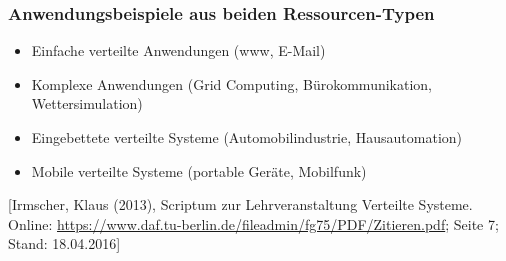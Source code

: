\documentclass[a4paper]{scrartcl}
\begin{document}
	\subsubsection{Anwendungsbeispiele aus beiden Ressourcen-Typen}
		\begin{itemize}
			\item Einfache verteilte Anwendungen (www, E-Mail)
			\item Komplexe Anwendungen (Grid Computing, Bürokommunikation, Wettersimulation)
			\item Eingebettete verteilte Systeme (Automobilindustrie, Hausautomation)
			\item Mobile verteilte Systeme (portable Geräte, Mobilfunk)
		\end{itemize}
		[Irmscher, Klaus (2013), Scriptum zur Lehrveranstaltung Verteilte Systeme. Online: \url{https://www.daf.tu-berlin.de/fileadmin/fg75/PDF/Zitieren.pdf}; Seite 7; Stand: 18.04.2016]
\end{document}
